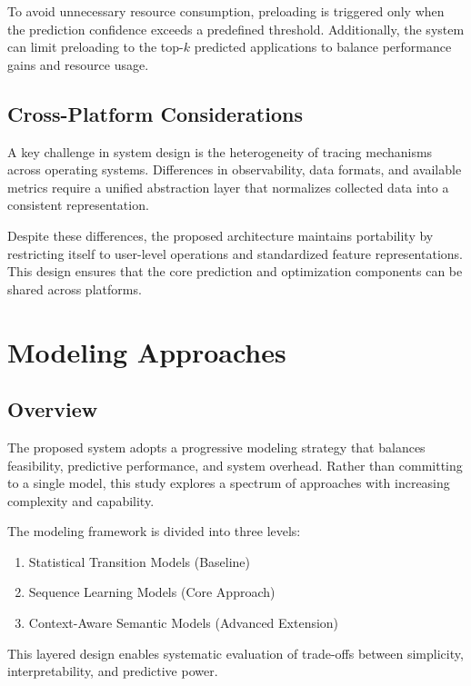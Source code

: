 \documentclass[11pt]{article}
\begin{document}
To avoid unnecessary resource consumption, preloading is triggered only when the prediction confidence exceeds a predefined threshold. Additionally, the system can limit preloading to the top-$k$ predicted applications to balance performance gains and resource usage.

\subsection{Cross-Platform Considerations}

A key challenge in system design is the heterogeneity of tracing mechanisms across operating systems. Differences in observability, data formats, and available metrics require a unified abstraction layer that normalizes collected data into a consistent representation.

Despite these differences, the proposed architecture maintains portability by restricting itself to user-level operations and standardized feature representations. This design ensures that the core prediction and optimization components can be shared across platforms.

\section{Modeling Approaches}

\subsection{Overview}

The proposed system adopts a progressive modeling strategy that balances feasibility, predictive performance, and system overhead. Rather than committing to a single model, this study explores a spectrum of approaches with increasing complexity and capability.

The modeling framework is divided into three levels:

\begin{enumerate}
\item Statistical Transition Models (Baseline)
\item Sequence Learning Models (Core Approach)
\item Context-Aware Semantic Models (Advanced Extension)
\end{enumerate}

This layered design enables systematic evaluation of trade-offs between simplicity, interpretability, and predictive power.
\end{document}
